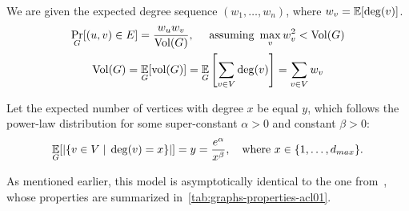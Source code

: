 We are given the expected degree sequence $(w_1,\ldots,w_n)$, where $w_v=\mathop{{}\mathbb{E}}[\deg(v)]$.
\begin{gather}
    \label{eq:powerlaw-coin-toss-edge-pr}
    \Pr_G[(u,v)\in E]=\frac{w_u w_v}{\operatorname*{Vol}(G)},
    \quad\text{ assuming }\max_v w_v^2<\operatorname*{Vol}(G)\\
    \operatorname*{Vol}(G)=\mathop{{}\mathbb{E}}_G[\operatorname*{vol}(G)]=\mathop{{}\mathbb{E}}_G\left[\sum_{v\in V} \deg(v)\right]=\sum_{v\in V} w_v
\end{gather}


Let the expected number of vertices with degree $x$ be equal $y$,
which follows the power-law distribution for some super-constant $\alpha>0$ and constant $\beta>0$:
\begin{equation}
    \mathop{{}\mathbb{E}}_G[|\{v \in V\;|\;\deg(v)=x\}|]=y=\frac{e^\alpha}{x^\beta},
    \quad\text{where }x\in\{1,\ldots,d_{max}\}.
\end{equation}

As mentioned earlier, this model is asymptotically identical
to the one from~\cite{acl01}, whose properties are summarized in~\autoref{tab:graphs-properties-acl01}.

